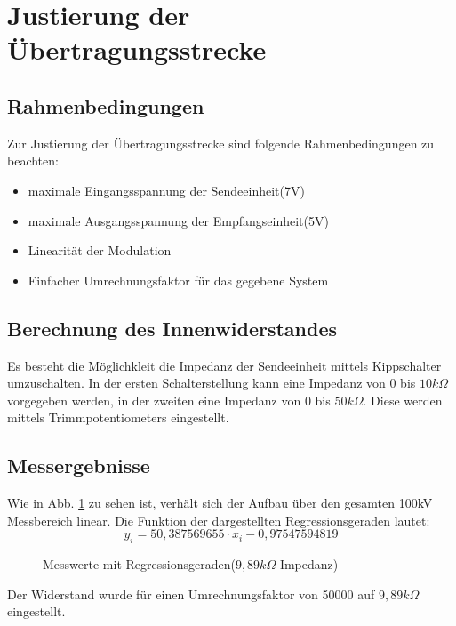 \section{Justierung der Übertragungsstrecke}
\subsection{Rahmenbedingungen}
Zur Justierung der Übertragungsstrecke sind folgende Rahmenbedingungen zu beachten:
\begin{itemize}
\item maximale Eingangsspannung der Sendeeinheit(7V)
\item maximale Ausgangsspannung der Empfangseinheit(5V)
\item Linearität der Modulation
\item Einfacher Umrechnungsfaktor für das gegebene System
\end{itemize}

\subsection{Berechnung des Innenwiderstandes}
Es besteht die Möglichkleit die Impedanz der Sendeeinheit mittels Kippschalter umzuschalten. In der ersten Schalterstellung kann eine Impedanz von 0 bis $10k\Omega$ vorgegeben werden, in der zweiten eine Impedanz von 0 bis $50k\Omega$. Diese werden mittels Trimmpotentiometers eingestellt. 
\subsection{Messergebnisse}
Wie in Abb. \ref{fig:9k89} zu sehen ist, verhält sich der Aufbau über den gesamten 100kV Messbereich linear. Die Funktion der dargestellten Regressionsgeraden lautet:
\begin{equation}
y_i = 50,387569655 \cdot x_i - 0,97547594819
\label{math:regress100kV}
\end{equation} 
  	\begin{figure}[H]
  	\begin{center}
  	
  	\caption{Messwerte mit Regressionsgeraden($9,89k \Omega$ Impedanz)\label{fig:9k89}}
		
		\end{center}
	\end{figure}
	Der Widerstand wurde für einen Umrechnungsfaktor von 50000 auf $9,89k\Omega$ eingestellt.
	\begin{figure}[H]
	
	\end{figure}
	
